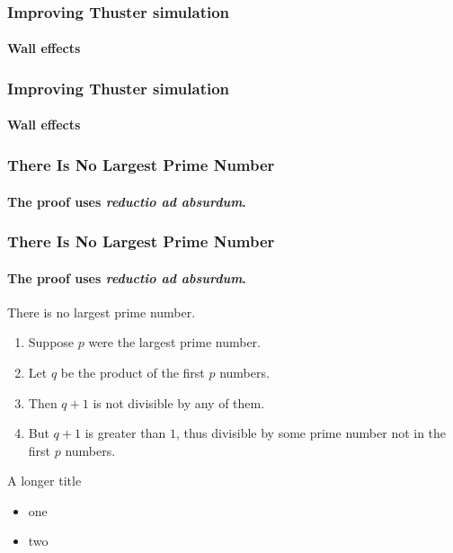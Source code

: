 \documentclass[sans, aspectratio=169]{beamer}
\begin{document}
\begin{frame} 
	\frametitle{Improving Thuster simulation} 
	\framesubtitle{ Wall effects} 

\end{frame}
\begin{frame} 
	\frametitle{Improving Thuster simulation} 
	\framesubtitle{ Wall effects} 

\end{frame}


\begin{frame} 
\frametitle{There Is No Largest Prime Number} 
\framesubtitle{The proof uses \textit{reductio ad absurdum}.} 

\end{frame}



\begin{frame} 
\frametitle{There Is No Largest Prime Number} 
\framesubtitle{The proof uses \textit{reductio ad absurdum}.} 
\begin{theorem}
There is no largest prime number. \end{theorem} 
\begin{enumerate} 
\item<1-| alert@1> Suppose $p$ were the largest prime number. 
\item<2-> Let $q$ be the product of the first $p$ numbers. 
\item<3-> Then $q+1$ is not divisible by any of them. 
\item<1-> But $q + 1$ is greater than $1$, thus divisible by some prime
number not in the first $p$ numbers.
\end{enumerate}
\end{frame}

\begin{frame}{A longer title}
\begin{itemize}
\item one
\item two
\end{itemize}
\end{frame}
\end{document}
